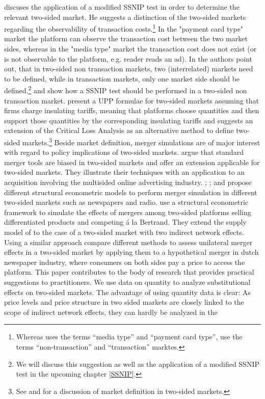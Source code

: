 \documentclass[10pt,a4paper]{scrreprt}
\begin{document}
\cite{filistrucchi_ssnip_2008} discuses the application of a modified SSNIP test in order to determine the relevant two-sided market. He suggests a distinction of the two-sided markets regarding the observability of transaction costs.\footnote{Whereas \cite{filistrucchi_ssnip_2008} uses the terms “media type” and “payment card type”, \cite{filistrucchi_market_2013} use the terms “non-transaction” and “transaction” marktes.} In the "payment card type" market the platform can observe the transaction cost between the two market sides, whereas in the "media type" market the transaction cost does not exist (or is not observable to the platform, e.g. reader reads an ad). In \cite{filistrucchi_market_2013} the authors point out, that in two-sided non transaction markets, two (interrelated) markets need to be defined, while in transaction markets, only one market side should be defined.\footnote{We will discuss this suggestion as well as the application of a modified SSNIP test in the upcoming chapter \ref{SSNIP}.} \cite{emch_market_2006} and \cite{alexandrov_antitrust_2011} show how a SSNIP test should be performed in a two-sided non transaction market. \cite{white_insulated_2012} present a UPP formulae for two-sided markets assuming that firms charge insulating tariffs, meaning that platforms choose quantities and then support those quantities by the corresponding insulating tariffs and \cite{noel_analyzing_2005} suggests an extension of the Critical Loss Analysis as an alternative method to define two-sided markets.\footnote{See \cite{evans_two-sided_2012} and \cite{filistrucchi_identifying_2012} for a discussion of market definition in two-sided markets.} Beside market definition, merger simulations are of major interest with regard to policy implications of two-sided markets. \cite{evans_analysis_2008} argue that standard merger tools are biased in two-sided markets and offer an extension applicable for two-sided markets. They illustrate their techniques with an application to an acquisition involving the multisided online advertising industry. \cite{fan_ownership_2013}; \cite{filistrucchi_merger_2010}; \cite{filistrucchi_assessing_2012} and \cite{jeziorski_merger_2010} propose different structural econometric models to perform merger simulation in different two-sided markets such as newspapers and radio. \cite{filistrucchi_merger_2010} use a structural econometric framework to simulate the effects of mergers among two-sided platforms selling differentiated products and competing á la Bertrand. They extend the supply model of \cite{argentesi_estimating_2007} to the case of a two-sided market with two indirect network effects. Using a similar approach \cite{filistrucchi_assessing_2012} compare different methods to assess unilateral merger effects in a two-sided market by applying them to a hypothetical merger in dutch newspaper industry, where consumers on both sides pay a price to access the platform. This paper contributes to the body of research that provides practical suggestions to practitioners. We use data on quantity to analyze substitutional effects on two-sided markets. The advantage of using quantity data is clear: As price levels and price structure in two sided markets are closely linked to the scope of indirect network effects, they can hardly be analyzed in the 
\end{document}
